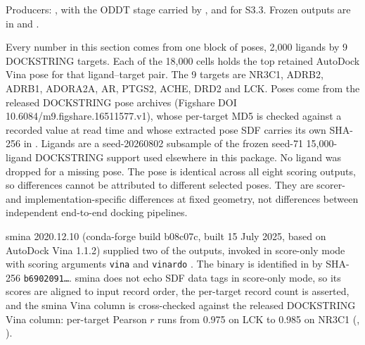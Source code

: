 
Producers: , with the ODDT stage carried by
, and
 for S3.3. Frozen outputs are in
 and
.


Every number in this section comes from one block of poses, 2{,}000 ligands by 9 DOCKSTRING
targets. Each of the 18{,}000 cells holds the top retained AutoDock Vina pose for that
ligand--target pair. The 9 targets are NR3C1, ADRB2, ADRB1, ADORA2A, AR, PTGS2, ACHE, DRD2
and LCK. Poses come from the released DOCKSTRING pose archives (Figshare DOI
10.6084/m9.figshare.16511577.v1), whose per-target MD5 is checked against a recorded value
at read time and whose extracted pose SDF carries its own SHA-256 in
. Ligands are a seed-20260802 subsample of the frozen seed-71
15{,}000-ligand DOCKSTRING support used elsewhere in this package. No ligand was dropped for
a missing pose. The pose is identical across all eight scoring outputs, so differences cannot be
attributed to different selected poses. They are scorer- and implementation-specific differences
at fixed geometry, not differences between independent end-to-end docking pipelines.

smina 2020.12.10 (conda-forge build b08c07c, built 15 July 2025, based on AutoDock Vina
1.1.2) supplied two of the outputs, invoked in score-only mode with scoring arguments
\texttt{vina} and \texttt{vinardo} \cite{smina2013,vinardo2016}. The binary is identified in
 by SHA-256 \texttt{b6902091\ldots}. smina does not echo SDF data tags in
score-only mode, so its scores are aligned to input record order, the per-target record count
is asserted, and the smina Vina column is cross-checked against the released DOCKSTRING Vina
column: per-target Pearson $r$ runs from 0.975 on LCK to 0.985 on NR3C1
(, ).

